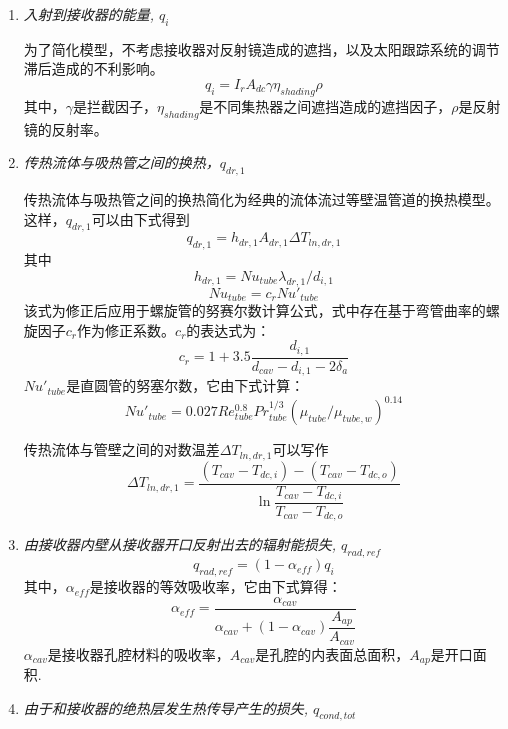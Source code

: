 \begin{enumerate}[label=(\arabic*)]
  \item \emph{入射到接收器的能量, $q_i$}
  
\setlength\parindent{2em}
为了简化模型，不考虑接收器对反射镜造成的遮挡，以及太阳跟踪系统的调节滞后造成的不利影响。
  \begin{equation}
      q_i = I_r A_{dc} \gamma \eta_{shading} \rho
      \label{eq:q_i}
  \end{equation}
其中，$\gamma$是拦截因子，$\eta_{shading}$是不同集热器之间遮挡造成的遮挡因子，$\rho$是反射镜的反射率。
  \item \emph{传热流体与吸热管之间的换热，$q_{dr,1}$}
  
  传热流体与吸热管之间的换热简化为经典的流体流过等壁温管道的换热模型。这样，$q_{dr,1}$可以由下式得到
  \begin{equation}
      q_{dr,1} = h_{dr,1}A_{dr,1}\Delta T_{ln,dr,1}
      \label{eq:q_dr_1}
  \end{equation}
  其中  
  \begin{equation}
      h_{dr,1} = Nu_{tube}\lambda_{dr,1} / d_{i,1}
\end{equation}
\begin{equation}
      Nu_{tube} = c_r Nu'_{tube}
\end{equation}
该式为修正后应用于螺旋管的努赛尔数计算公式，式中存在基于弯管曲率的螺旋因子$c_r$作为修正系数。$c_r$的表达式为\cite{Pablo2008}：
\begin{equation}
	c_{r}=1+3.5\frac{d_{i,1}}{d_{cav}-d_{i,1}-2\delta_{a}}
\end{equation}
$Nu'_{tube}$是直圆管的努塞尔数，它由下式计算\cite{Serth2007}：
\begin{equation}
	Nu'_{tube}= 0.027Re_{tube}^{0.8}Pr_{tube}^{1/3}(\mu_{tube}/\mu_{tube,w})^{0.14}
\end{equation}

传热流体与管壁之间的对数温差$\Delta{}T_{ln,dr,1}$可以写作
\begin{equation}
	\Delta{}T_{ln,dr,1}=\frac{(T_{cav}-T_{dc,i})-(T_{cav}-T_{dc,o})}{\ln\dfrac{T_{cav}-T_{dc,i}}{T_{cav}-T_{dc,o}}}
\end{equation}

  \item \emph{由接收器内壁从接收器开口反射出去的辐射能损失, $q_{rad,ref}$}
  \begin{equation}
    q_{rad,ref}=(1-\alpha_{eff})q_{i}
\end{equation}
    其中，$\alpha_{eff}$是接收器的等效吸收率，它由下式算得：
    \begin{equation}
    \alpha_{eff}=\frac{\alpha_{cav}}{\alpha_{cav}+(1-\alpha_{cav})\dfrac{A_{ap}}{A_{cav}}}
    \end{equation} 
$\alpha_{cav}$是接收器孔腔材料的吸收率，$A_{cav}$是孔腔的内表面总面积，$A_{ap}$是开口面积.
  \item \emph{由于和接收器的绝热层发生热传导产生的损失, $q_{cond,tot}$}
  

\end{enumerate}
